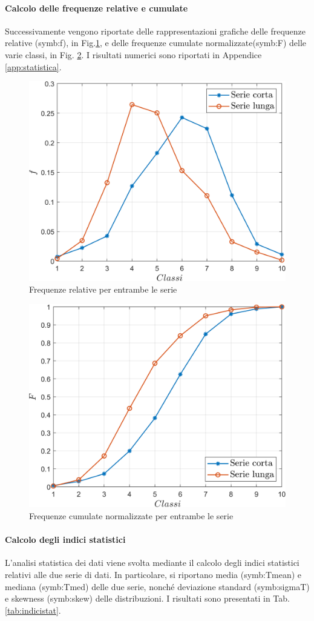 \paragraph{Calcolo delle frequenze relative e cumulate}
Successivamente vengono riportate delle rappresentazioni grafiche 
delle frequenze relative (\gls{symb:f}), in Fig.\ref{fig:relboth}, e delle frequenze cumulate normalizzate(\gls{symb:F}) delle varie classi, in Fig. \ref{fig:cumboth}. I risultati numerici sono riportati in Appendice \ref{app:statistica}.



\begin{figure}[H]
	\centering
	\includegraphics[width=0.6\linewidth]{"../sperimentazione nei propulsori/relboth"}
	\caption{Frequenze relative per entrambe le serie}
	\label{fig:relboth}
\end{figure}


\begin{figure}[H]
	\centering
	\includegraphics[width=0.6\linewidth]{"../sperimentazione nei propulsori/cumboth"}
	\caption{Frequenze cumulate normalizzate per entrambe le serie}
	\label{fig:cumboth}
\end{figure}



\paragraph{Calcolo degli indici statistici}
L'analisi statistica dei dati viene svolta mediante il calcolo degli indici statistici relativi alle due serie di dati. In particolare, si riportano media (\gls{symb:Tmean}) e mediana (\gls{symb:Tmed}) delle due serie, nonché deviazione standard (\gls{symb:sigmaT}) e skewness (\gls{symb:skew}) delle distribuzioni. I risultati sono presentati in Tab.\ref{tab:indicistat}.

